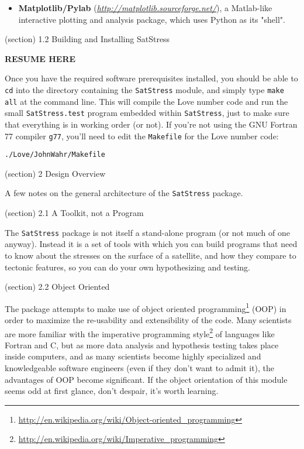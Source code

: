     \begin{itemize}
    \setlength{\parskip}{0.6ex}
      \item \textbf{Matplotlib/Pylab} 
        (\href{http://matplotlib.sourceforge.net/}{\textit{http://matplotlib.sourceforge.net/}}),
        a Matlab-like interactive plotting and analysis package, which uses
        Python as its "shell".

    \end{itemize}

  (section) 1.2 Building and Installing SatStress

    \textbf{RESUME HERE}

    Once you have the required software prerequisites installed, you should
    be able to \texttt{cd} into the directory containing the 
    \texttt{SatStress} module, and simply type \texttt{make all} at the 
    command line.  This will compile the Love number code and run the small
    \texttt{SatStress.test} program embedded within \texttt{SatStress}, 
    just to make sure that everything is in working order (or not).  If 
    you're not using the GNU Fortran 77 compiler \texttt{g77}, you'll need 
    to edit the \texttt{Makefile} for the Love number code:

\begin{alltt}
 ./Love/JohnWahr/Makefile\end{alltt}

(section) 2 Design Overview

  A few notes on the general architecture of the \texttt{SatStress} 
  package.

  (section) 2.1 A Toolkit, not a Program

    The \texttt{SatStress} package is not itself a stand-alone program (or 
    not much of one anyway).  Instead it is a set of tools with which you 
    can build programs that need to know about the stresses on the surface 
    of a satellite, and how they compare to tectonic features, so you can 
    do your own hypothesizing and testing.

  (section) 2.2 Object Oriented

    The package attempts to make use of object oriented 
    programming\footnote{\href{http://en.wikipedia.org/wiki/Object-oriented_programming}{http://en.wikipedia.org/wiki/Object-oriented\_programming}}
    (OOP) in order to maximize the re-usability and extensibility of the 
    code.  Many scientists are more familiar with the imperative 
    programming 
    style\footnote{\href{http://en.wikipedia.org/wiki/Imperative_programming}{http://en.wikipedia.org/wiki/Imperative\_programming}}
    of languages like Fortran and C, but as more data analysis and 
    hypothesis testing takes place inside computers, and as many scientists
    become highly specialized and knowledgeable software engineers (even if
    they don't want to admit it), the advantages of OOP become significant.
    If the object orientation of this module seems odd at first glance, 
    don't despair, it's worth learning.

